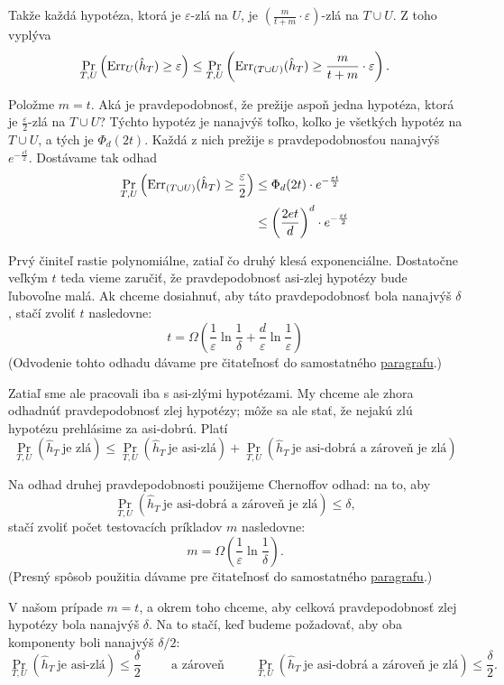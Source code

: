 Takže každá hypotéza, ktorá je $\varepsilon$-zlá na $U$, je
$\left( \frac{m}{t+m} \cdot \varepsilon \right)$-zlá na $T \cup U$.
Z toho vyplýva
$$ \Pr_{T, U} \left( \mathrm{Err}_U(\hat{h}_T) \geq \varepsilon \right) \leq \Pr_{T, U} \left( \mathrm{Err}_{(T \cup U)}(\hat{h}_T) \geq \frac{m}{t + m} \cdot \varepsilon \right). $$

Položme $m = t$. Aká je pravdepodobnosť, že prežije aspoň jedna hypotéza,
ktorá je $\frac{\varepsilon}{2}$-zlá na $T \cup U$? Týchto hypotéz je
nanajvýš toľko, koľko je všetkých hypotéz na $T \cup U$, a tých je
$\Phi_d(2t)$. Každá z nich prežije s pravdepodobnosťou nanajvýš
$e^{-\frac{\varepsilon t}{2}}$. Dostávame tak odhad
\begin{align}
  \Pr_{T, U} \left( \mathrm{Err}_{(T \cup U)}(\hat{h}_T) \geq \frac{\varepsilon}{2} \right)
    &\leq \Phi_d(2t) \cdot e^{-\frac{\varepsilon t}{2}}   \\
    &\leq \left( \frac{2et}{d} \right)^d \cdot e^{-\frac{\varepsilon t}{2}}     \label{vc-dokaz:prob-asi-zle}
\end{align}

Prvý činiteľ rastie polynomiálne, zatiaľ čo druhý klesá exponenciálne.
Dostatočne veľkým $t$ teda vieme zaručiť, že pravdepodobnosť asi-zlej
hypotézy bude ľubovoľne malá. Ak chceme dosiahnuť, aby táto pravdepodobnosť
bola nanajvýš $\delta$, stačí zvoliť $t$ nasledovne:
$$ t = \Omega \left( \frac{1}{\varepsilon} \ln \frac{1}{\delta} + \frac{d}{\varepsilon} \ln \frac{1}{\varepsilon} \right) $$
(Odvodenie tohto odhadu dávame pre čitateľnosť do samostatného
\hyperref[vc-dokaz:analyza-asi-zla-h]{paragrafu}.)

Zatiaľ sme ale pracovali iba s asi-zlými hypotézami. My chceme ale zhora
odhadnúť pravdepodobnosť zlej hypotézy; môže sa ale stať, že nejakú zlú
hypotézu prehlásime za asi-dobrú. Platí
$$ \Pr_{T, U} \left( \hat{h}_T\ \text{je zlá} \right) \leq \Pr_{T, U} \left( \hat{h}_T\ \text{je asi-zlá} \right) + \Pr_{T, U} \left( \hat{h}_T\ \text{je asi-dobrá a zároveň je zlá} \right) $$

Na odhad druhej pravdepodobnosti použijeme Chernoffov odhad: na to, aby
$$ \Pr_{T, U} \left( \hat{h}_T\ \text{je asi-dobrá a zároveň je zlá} \right) \leq \delta, $$
stačí zvoliť počet testovacích príkladov $m$ nasledovne:
$$ m = \Omega \left( \frac{1}{\varepsilon} \ln \frac{1}{\delta} \right). $$
(Presný spôsob použitia dávame pre čitateľnosť do samostatného
\hyperref[vc-dokaz:chernoff]{paragrafu}.)

V našom prípade $m = t$, a okrem toho chceme, aby celková pravdepodobnosť
zlej hypotézy bola nanajvýš $\delta$. Na to stačí, keď budeme požadovať,
aby oba komponenty boli nanajvýš $\delta/2$:
$$ \Pr_{T, U} \left( \hat{h}_T\ \text{je asi-zlá} \right) \leq \frac{\delta}{2} \hspace{1cm} \text{a zároveň} \hspace{1cm} \Pr_{T, U} \left( \hat{h}_T\ \text{je asi-dobrá a zároveň je zlá} \right) \leq \frac{\delta}{2}. $$

